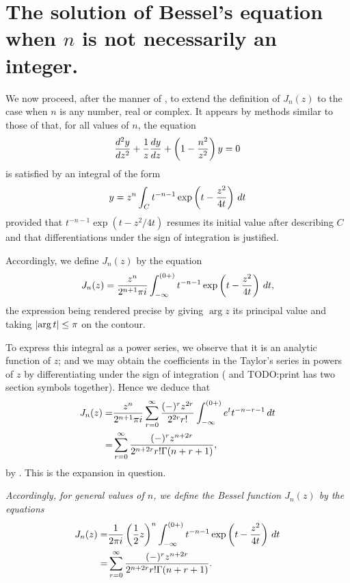 \documentclass{book}
\begin{document}
\section{The solution of Bessel's equation when $n$ is not necessarily
  an integer.}
We now proceed, after the manner of , to
extend the definition of $J_n(z)$ to the case when $n$ is any number,
real or complex. It appears by methods similar to those of
 that, for all values of $n$, the
equation
$$
\frac{d^2 y}{dz^2}
+ \frac{1}{z} \frac{dy}{dz}
+ \left(  1 - \frac{n^2}{z^2}   \right) y
= 0
$$
is satisfied by an integral of the form
$$
y
=
z^n
\int_C
t^{-n-1}
\exp \left(  t - \frac{z^2}{4t}   \right)
\, d t
$$
provided that $t^{-n-1}\exp(t - z^2/4t)$ resumes its initial value
after describing $C$ and that differentiations under the sign of
integration is justified.

Accordingly, we define $J_n(z)$ by the equation
$$
J_n(z) 
= 
\frac{z^n}{2^{n+1}\pi i}
\int_{-\infty}^{(0+)}
t^{-n-1} 
\exp\left(  t - \frac{z^2}{4t}   \right)
\, d t,
$$
the expression being rendered precise by giving
$\arg z$ its principal value and taking
$\left|  \arg t  \right| \leq \pi$ on the contour.

To express this integral as a power series, we observe that it is an
analytic function of $z$; and we may obtain the coefficients in the
Taylor's series in powers of $z$ by differentiating under the sign of 
integration
( and 
TODO:print has two section symbols together).
Hence we deduce that
\begin{align*}
  J_n(z)
  =& \frac{z^n}{2^{n+1}\pi i}
  \sum_{r=0}^{\infty} \frac{ (-)^r z^{2r}  }{ 2^{2r} r!  }
  \int_{-\infty}^{(0+)}
  e^t
  t^{-n-r-1}
  \, d t
  \\
  =&
  \sum_{r=0}^{\infty}
  \frac{ (-)^r z^{n+2r}  }{ 2^{n+2r} r! \Gamma(n+r+1)  },
\end{align*}
by . This is the expansion in question.

%
%
\emph{Accordingly, for general values of $n$, we define the
  \emph{Bessel function} $J_n(z)$ by the equations}
\begin{align*}
  J_n(z)
  =& \frac{1}{2\pi i} \left( \frac{1}{2} z \right)^n
  \int_{-\infty}^{(0+)}
  t^{-n-1}
  \exp\left(  t - \frac{z^2}{4t}   \right)
  \, d t
  \\
  =&
  \sum_{r=0}^{\infty}
  \frac{ (-)^r z^{n+2r}  }{ 2^{n+2r} r! \Gamma(n+r+1)  }.
\end{align*}
\end{document}
